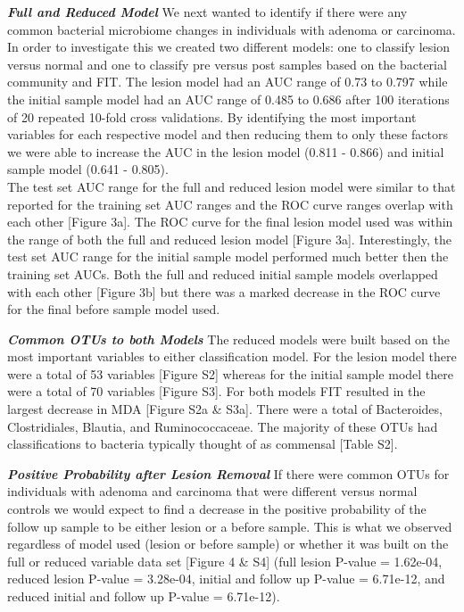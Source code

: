 \documentclass[12pt,]{article}
\begin{document}
\textbf{\emph{Full and Reduced Model}} We next wanted to identify if
there were any common bacterial microbiome changes in individuals with
adenoma or carcinoma. In order to investigate this we created two
different models: one to classify lesion versus normal and one to
classify pre versus post samples based on the bacterial community and
FIT. The lesion model had an AUC range of 0.73 to 0.797 while the
initial sample model had an AUC range of 0.485 to 0.686 after 100
iterations of 20 repeated 10-fold cross validations. By identifying the
most important variables for each respective model and then reducing
them to only these factors we were able to increase the AUC in the
lesion model (0.811 - 0.866) and initial sample model (0.641 - 0.805).\\
The test set AUC range for the full and reduced lesion model were
similar to that reported for the training set AUC ranges and the ROC
curve ranges overlap with each other {[}Figure 3a{]}. The ROC curve for
the final lesion model used was within the range of both the full and
reduced lesion model {[}Figure 3a{]}. Interestingly, the test set AUC
range for the initial sample model performed much better then the
training set AUCs. Both the full and reduced initial sample models
overlapped with each other {[}Figure 3b{]} but there was a marked
decrease in the ROC curve for the final before sample model used.

\textbf{\emph{Common OTUs to both Models}} The reduced models were built
based on the most important variables to either classification model.
For the lesion model there were a total of 53 variables {[}Figure S2{]}
whereas for the initial sample model there were a total of 70 variables
{[}Figure S3{]}. For both models FIT resulted in the largest decrease in
MDA {[}Figure S2a \& S3a{]}. There were a total of Bacteroides,
Clostridiales, Blautia, and Ruminococcaceae. The majority of these OTUs
had classifications to bacteria typically thought of as commensal
{[}Table S2{]}.

\textbf{\emph{Positive Probability after Lesion Removal}} If there were
common OTUs for individuals with adenoma and carcinoma that were
different versus normal controls we would expect to find a decrease in
the positive probability of the follow up sample to be either lesion or
a before sample. This is what we observed regardless of model used
(lesion or before sample) or whether it was built on the full or reduced
variable data set {[}Figure 4 \& S4{]} (full lesion P-value = 1.62e-04,
reduced lesion P-value = 3.28e-04, initial and follow up P-value =
6.71e-12, and reduced initial and follow up P-value = 6.71e-12).
\end{document}
